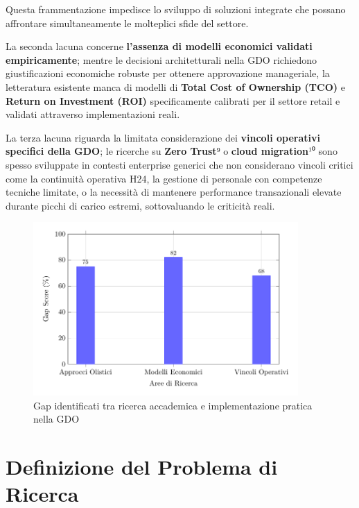 \documentclass[12pt,a4paper,oneside]{book}
\begin{document}
Questa frammentazione impedisce lo sviluppo di soluzioni integrate che
possano affrontare simultaneamente le molteplici sfide del settore.

La seconda lacuna concerne \textbf{l'assenza di modelli economici validati
empiricamente}; mentre le decisioni architetturali nella GDO richiedono
giustificazioni economiche robuste per ottenere approvazione
manageriale, la letteratura esistente manca di modelli di \textbf{Total
Cost of Ownership (TCO)} e \textbf{Return on Investment (ROI)}
specificamente calibrati per il settore retail e validati attraverso
implementazioni reali.

La terza lacuna riguarda la limitata considerazione dei \textbf{vincoli
operativi specifici della GDO}; le ricerche su \textbf{Zero Trust}⁹ o
\textbf{cloud migration}¹⁰ sono spesso sviluppate in contesti enterprise
generici che non considerano vincoli critici come la continuità
operativa H24, la gestione di personale con competenze tecniche
limitate, o la necessità di mantenere performance transazionali elevate
durante picchi di carico estremi, sottovaluando le criticità reali.

\begin{figure}[htbp]
    \centering
    \includegraphics[width=0.9\textwidth]{figura 1-1}
    \caption{Gap identificati tra ricerca accademica e implementazione pratica nella GDO}
\label{fig:gap_ricerca}
\end{figure}

\section{\texorpdfstring{\textbf{Definizione del Problema di
Ricerca}}{1.2 Definizione del Problema di Ricerca}}\label{definizione-del-problema-di-ricerca}
\end{document}
